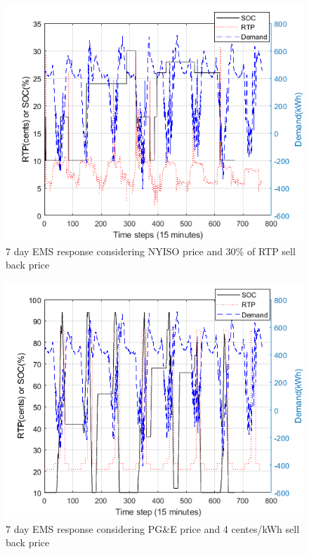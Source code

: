  \begin{figure}[!ht]
    \centering
    \includegraphics[width = \linewidth]{figs/VAR_10_12_30rtp.png}
    \caption{7 day EMS response considering NYISO price and 30\% of RTP sell back price}
    \label{fig:VAR_10_12_30rtp}
\end{figure}

 \begin{figure}[!ht]
    \centering
    \includegraphics[width = \linewidth]{figs/PG_VAR_10_12_4.png}
    \caption{7 day EMS response considering PG\&E price and 4 centes/kWh sell back price}
    \label{fig:PG_VAR_10_12_4}
\end{figure}

